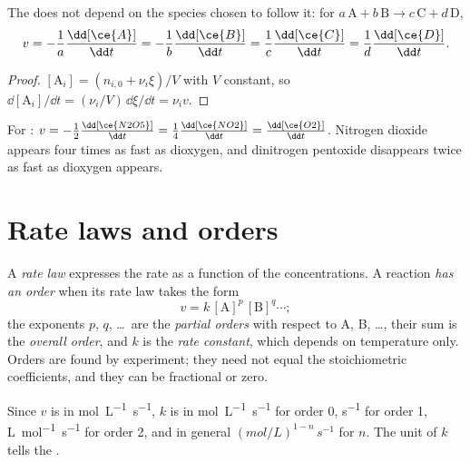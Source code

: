 \begin{proposition}\label{prop:b1:rate-laws:rate-relations}
The  does not depend on the species chosen to follow it:
for $a\,\mathrm{A} + b\,\mathrm{B} \longrightarrow c\,\mathrm{C} + d\,\mathrm{D}$,
\[
  v = -\frac1a\frac{\dd[\ce{A}]}{\dd t} = -\frac1b\frac{\dd[\ce{B}]}{\dd t}
  = \frac1c\frac{\dd[\ce{C}]}{\dd t} = \frac1d\frac{\dd[\ce{D}]}{\dd t} .
\]
\end{proposition}

\begin{proof}
$[\mathrm{A}_i] = (n_{i,0} + \nu_i\xi)/V$ with $V$ constant, so
$\dd[\mathrm{A}_i]/\dd t = (\nu_i/V)\,\dd\xi/\dd t = \nu_i v$.
\end{proof}

\begin{example}\label{ex:b1:rate-laws:n2o5}
For : $v = -\frac12\frac{\dd[\ce{N2O5}]}{\dd t} =
\frac14\frac{\dd[\ce{NO2}]}{\dd t} = \frac{\dd[\ce{O2}]}{\dd t}$. Nitrogen
dioxide appears four times as fast as dioxygen, and dinitrogen pentoxide
disappears twice as fast as dioxygen appears.
\end{example}

\section{Rate laws and orders}

\begin{definition}\label{def:b1:rate-laws:order}
A \emph{rate law} expresses the rate as a function of the
concentrations. A reaction \emph{has an order} when its rate law takes the
form
\[
  v = k\,[\mathrm{A}]^{p}\,[\mathrm{B}]^{q} \cdots ;
\]
the exponents $p$, $q$, \dots\ are the \emph{partial orders}
with respect to A, B, \dots, their sum is the \emph{overall
order}, and $k$ is the \emph{rate constant},
which depends on temperature only. Orders are found by
experiment; they need not equal the stoichiometric coefficients, and they
can be fractional or zero.
\end{definition}

\begin{remark}[Units of $k$]\label{rem:b1:rate-laws:units}
Since $v$ is in \unit{mol.L^{-1}.s^{-1}}, $k$ is in
\unit{mol.L^{-1}.s^{-1}} for order 0, \unit{s^{-1}} for order 1,
\unit{L.mol^{-1}.s^{-1}} for order 2, and in general
$(\unit{mol/L})^{1-n}\,\unit{s^{-1}}$ for  $n$. The unit of
$k$ tells the .
\end{remark}

